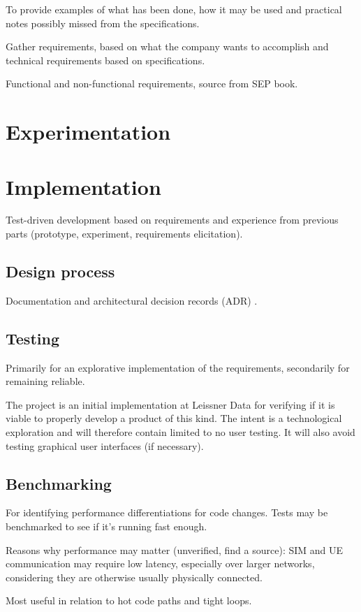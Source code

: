 To provide examples of what has been done, how it may be used and
practical notes possibly missed from the specifications.

Gather requirements, based on what the company wants to
accomplish and technical requirements based on specifications.

Functional and non-functional requirements, source from 
SEP book.

\section{Experimentation}
\label{sec:experimentation}

\section{Implementation}
\label{sec:implementation}

Test-driven development based on requirements and experience from
previous parts (prototype, experiment, requirements elicitation).

\subsection{Design process}

Documentation and architectural decision records (ADR)
\cite{adr, adr-github}.

\subsection{Testing}

Primarily for an explorative implementation of the requirements,
secondarily for remaining reliable.

The project is an initial implementation at Leissner Data for
verifying if it is viable to properly develop a product of this
kind. The intent is a technological exploration and will
therefore contain limited to no user testing. It will also avoid
testing graphical user interfaces (if necessary).

\subsection{Benchmarking}

For identifying performance differentiations for code changes.
Tests may be benchmarked to see if it's running fast enough.

Reasons why performance may matter (unverified, find a source):
SIM and UE communication may require low latency, especially over
larger networks, considering they are otherwise usually
physically connected.

Most useful in relation to hot code paths and tight loops.
